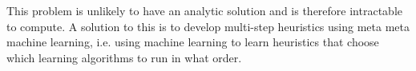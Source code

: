 \documentclass[a4paper,12pt,twoside,openright]{report}
\begin{document}
This problem is unlikely to have an analytic solution and is therefore intractable to compute. A solution to this is to develop multi-step heuristics using meta meta machine learning, i.e. using machine learning to learn heuristics that choose which learning algorithms to run in what order.







\appendix
\singlespacing


 

\end{document}
